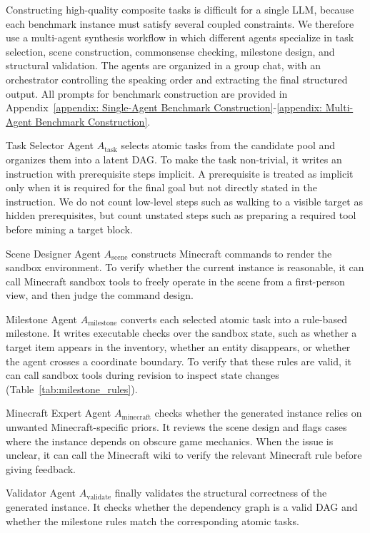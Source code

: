 \documentclass[11pt]{article}
\begin{document}
Constructing high-quality composite tasks is difficult for a single LLM, because each benchmark instance must satisfy several coupled constraints. 
We therefore use a multi-agent synthesis workflow in which different agents specialize in task selection, scene construction, commonsense checking, milestone design, and structural validation.
The agents are organized in a group chat, with an orchestrator controlling the speaking order and extracting the final structured output. 
All prompts for benchmark construction are provided in Appendix~\ref{appendix: Single-Agent Benchmark Construction}-\ref{appendix: Multi-Agent Benchmark Construction}.

Task Selector Agent $A_\mathrm{task}$ selects atomic tasks from the candidate pool and organizes them into a latent DAG. 
To make the task non-trivial, it writes an instruction with prerequisite steps implicit. 
A prerequisite is treated as implicit only when it is required for the final goal but not directly stated in the instruction. 
We do not count low-level steps such as walking to a visible target as hidden prerequisites, but count unstated steps such as preparing a required tool before mining a target block.

Scene Designer Agent $A_\mathrm{scene}$ constructs Minecraft commands to render the sandbox environment. 
To verify whether the current instance is reasonable, it can call Minecraft sandbox tools to freely operate in the scene from a first-person view, and then judge the command design.

Milestone Agent $A_\mathrm{milestone}$ converts each selected atomic task into a rule-based milestone. 
It writes executable checks over the sandbox state, such as whether a target item appears in the inventory, whether an entity disappears, or whether the agent crosses a coordinate boundary. 
To verify that these rules are valid, it can call sandbox tools during revision to inspect state changes (Table~\ref{tab:milestone_rules}).

Minecraft Expert Agent $A_\mathrm{minecraft}$ checks whether the generated instance relies on unwanted Minecraft-specific priors. 
It reviews the scene design and flags cases where the instance depends on obscure game mechanics. When the issue is unclear, it can call the Minecraft wiki to verify the relevant Minecraft rule before giving feedback.

Validator Agent $A_\mathrm{validate}$ finally validates the structural correctness of the generated instance. 
It checks whether the dependency graph is a valid DAG and whether the milestone rules match the corresponding atomic tasks.
\end{document}
